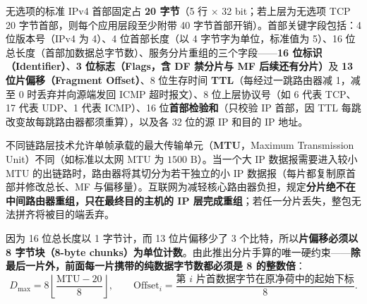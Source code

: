 无选项的标准 IPv4 首部固定占 \textbf{20 字节}（5 行 $\times$ 32 bit；若上层为无选项 TCP 20 字节首部，则每个应用层段至少附带 40 字节首部开销）。首部关键字段包括：4 位版本号（IPv4 为 4）、4 位首部长度（以 4 字节字为单位，标准值为 5）、16 位总长度（首部加数据总字节数）、服务分片重组的三个字段——\textbf{16 位标识（Identifier）}、\textbf{3 位标志（Flags，含 DF 禁分片与 MF 后续还有分片）}及 \textbf{13 位片偏移（Fragment Offset）}、8 位生存时间 \textbf{TTL}（每经过一跳路由器减 1，减至 0 时丢弃并向源端发回 ICMP 超时报文）、8 位上层协议号（如 6 代表 TCP、17 代表 UDP、1 代表 ICMP）、16 位\textbf{首部检验和}（只校验 IP 首部，因 TTL 每跳改变故每跳路由器都须重算），以及各 32 位的源 IP 和目的 IP 地址。

不同链路层技术允许单帧承载的最大传输单元（\textbf{MTU}，Maximum Transmission Unit）不同（如标准以太网 MTU 为 $1500\text{ B}$）。当一个大 IP 数据报需要进入较小 MTU 的出链路时，路由器将其切分为若干独立的小 IP 数据报（每片都复制原首部并修改总长、MF 与偏移量）。互联网为减轻核心路由器负担，规定\textbf{分片绝不在中间路由器重组，只在最终目的主机的 IP 层完成重组}；若任一分片丢失，整包无法拼齐将被目的端丢弃。

因为 16 位总长度以 1 字节计，而 13 位片偏移少了 3 个比特，所以\textbf{片偏移必须以 8 字节块（8-byte chunks）为单位计数}。由此推出分片手算的唯一硬约束——\textbf{除最后一片外，前面每一片携带的纯数据字节数都必须是 8 的整数倍}：
\[
D_{\max} = 8\left\lfloor \frac{\mathrm{MTU} - 20}{8} \right\rfloor,
\qquad
\mathrm{Offset}_i = \frac{\text{第 $i$ 片首数据字节在原净荷中的起始下标}}{8}.
\tag{4.2}
\]

